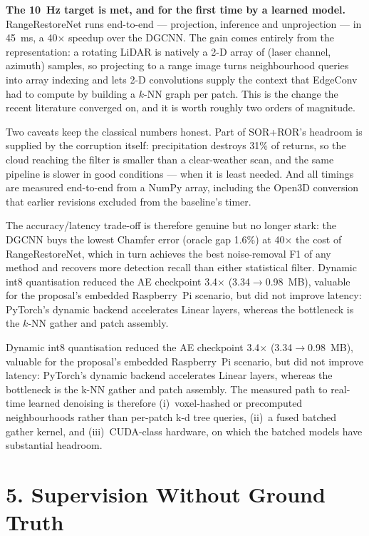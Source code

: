 \documentclass[12pt,a4paper]{article}
\begin{document}
\textbf{The 10~Hz target is met, and for the first time by a learned
model.} RangeRestoreNet runs end-to-end --- projection, inference and
unprojection --- in 45~ms, a 40$\times$ speedup over the DGCNN. The gain
comes entirely from the representation: a rotating LiDAR is natively a 2-D
array of (laser channel, azimuth) samples, so projecting to a range image
turns neighbourhood queries into array indexing and lets 2-D convolutions
supply the context that EdgeConv had to compute by building a $k$-NN graph
per patch. This is the change the recent literature converged on, and it is
worth roughly two orders of magnitude.

Two caveats keep the classical numbers honest. Part of SOR+ROR's headroom
is supplied by the corruption itself: precipitation destroys 31\% of
returns, so the cloud reaching the filter is smaller than a clear-weather
scan, and the same pipeline is slower in good conditions --- when it is
least needed. And all timings are measured end-to-end from a NumPy array,
including the Open3D conversion that earlier revisions excluded from the
baseline's timer.

The accuracy/latency trade-off is therefore genuine but no longer stark: the
DGCNN buys the lowest Chamfer error (oracle gap 1.6\%) at 40$\times$ the
cost of RangeRestoreNet, which in turn achieves the best noise-removal F1
of any method and recovers more detection recall than either statistical
filter. Dynamic int8 quantisation reduced the AE checkpoint 3.4$\times$
(3.34$\to$0.98~MB), valuable for the proposal's embedded Raspberry~Pi
scenario, but did not improve latency: PyTorch's dynamic backend accelerates
Linear layers, whereas the bottleneck is the $k$-NN gather and patch
assembly.

Dynamic int8 quantisation reduced the AE checkpoint 3.4$\times$
(3.34$\to$0.98~MB), valuable for the proposal's embedded Raspberry~Pi
scenario, but did not improve latency: PyTorch's dynamic backend
accelerates Linear layers, whereas the bottleneck is the k-NN gather and
patch assembly. The measured path to real-time learned denoising is
therefore (i)~voxel-hashed or precomputed neighbourhoods rather than
per-patch k-d tree queries, (ii)~a fused batched gather kernel, and
(iii)~CUDA-class hardware, on which the batched models have substantial
headroom.

\section*{5. Supervision Without Ground Truth}
\end{document}
